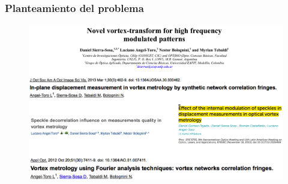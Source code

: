 \documentclass[xcolor=table,serif]{beamer}
\begin{document}
\addtocounter{framenumber}{-1}
\begin{frame}
\frametitle{Planteamiento del problema}
\begin{figure}
  \includegraphics[scale = 0.45]{Figures/presentation/metrologia.png}
  \end{figure}
\end{frame}
\end{document}
